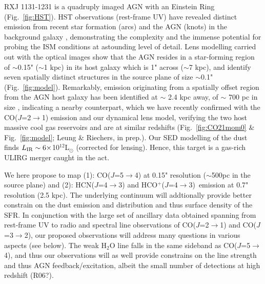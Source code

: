 \documentclass[12pt,a4paper]{article}  %
\newcommand{\Lsun}{\mbox{L$_{\odot}$}\xspace}
\newcommand{\rarr}{$\rightarrow$}
\newcommand{\bco}{\mbox{CO($J$=2\rarr1)}\xspace}
\newcommand{\eco}{\mbox{CO($J$=5\rarr4)}\xspace}
\newcommand{\rot}[3][HCN]{\mbox{#1($J$=#2\rarr#3)}\xspace}
\newcommand{\dhcn}{\mbox{HCN($J$=4\rarr3)}\xspace}
\newcommand{\dhcop}{\mbox{HCO$^+$($J$=4\rarr3) }}
\newcommand{\Fig}[1]{Fig.~\ref{fig:#1}}
\begin{document}
RXJ 1131-1231 is a quadruply imaged AGN with an Einstein Ring 
(\Fig{HST}). 
HST observations (rest-frame UV) have revealed distinct emission 
from recent star formation (arcs) and the AGN (knots) in the background galaxy \citep{Sluse03a},
demonstrating the complexity and the immense potential for probing the 
ISM conditions at astounding level of detail.
Lens modelling carried out with the optical images show
that the AGN resides in a star-forming region of $\sim$0.15" ($\sim$1 kpc)
in its host galaxy which is 1" across ($\sim$7 kpc), and identify
seven spatially distinct structures in the source plane of size 
$\sim$0.1" (\Fig{model}). Remarkably, emission originating from 
a spatially offset region from the AGN host galaxy has been identified 
at $\sim$ 2.4 kpc away, of $\sim$ 700 pc in size \citep{Brewer08a}, 
indicating a nearby counterpart, which we have recently confirmed with
the \rot[CO]{2}{1} emission and our dynamical lens model, 
verifying the two host massive cool gas reservoirs and are at similar redshifts (\Fig{CO21mom0} \& \Fig{model}; Leung \& Riechers, in prep.). 
Our SED modelling of the dust finds $L_{\rm IR}\sim6\times$10$^{12}$\Lsun 
(corrected for lensing). Hence, this target is a gas-rich ULIRG merger caught in the act. 

We here propose to map (1): 
\eco at 0.15" resolution ($\sim$500pc in the source plane) and (2): \dhcn and \dhcop emission 
at 0.7" resolution (2.5 kpc). The 
underlying continuum will addtionally provide
better constrain on the dust emission and distribution and thus surface density of the SFR. 
In conjunction with the large set of ancillary data obtained spanning from
rest-frame UV to radio and spectral line observations of \bco and \rot[CO]{3}{2}, our
proposed observations will address many questions in various aspects (see below).
The weak H$_2$O line falls in the same sideband as \eco, and thus our observations 
will as well provide constrains on the line strength and thus AGN feedback/excitation,
albeit the small number of detections at high redshift (R06?).
\end{document}
